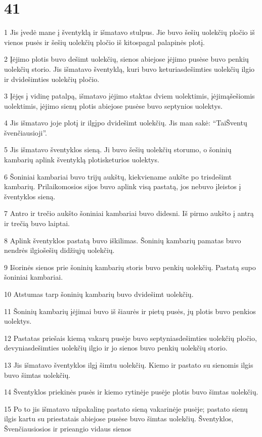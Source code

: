 \chapter{41}


\par 1 Jis įvedė mane į šventyklą ir išmatavo stulpus. Jie buvo šešių uolekčių pločio iš vienos pusės ir šešių uolekčių pločio iš kitos­pagal palapinės plotį. 
\par 2 Įėjimo plotis buvo dešimt uolekčių, sienos abiejose įėjimo pusėse buvo penkių uolekčių storio. Jis išmatavo šventyklą, kuri buvo keturiasdešimties uolekčių ilgio ir dvidešimties uolekčių pločio. 
\par 3 Įėjęs į vidinę patalpą, išmatavo įėjimo staktas dviem uolektimis, įėjimą­šešiomis uolektimis, įėjimo sienų plotis abiejose pusėse buvo septynios uolektys. 
\par 4 Jis išmatavo joje plotį ir ilgį­po dvidešimt uolekčių. Jis man sakė: “Tai­Šventų švenčiausioji”. 
\par 5 Jis išmatavo šventyklos sieną. Ji buvo šešių uolekčių storumo, o šoninių kambarių aplink šventyklą plotis­keturios uolektys. 
\par 6 Šoniniai kambariai buvo trijų aukštų, kiekviename aukšte po trisdešimt kambarių. Prilaikomosios sijos buvo aplink visą pastatą, jos nebuvo įleistos į šventyklos sieną. 
\par 7 Antro ir trečio aukšto šoniniai kambariai buvo didesni. Iš pirmo aukšto į antrą ir trečią buvo laiptai. 
\par 8 Aplink šventyklos pastatą buvo iškilimas. Šoninių kambarių pamatas buvo nendrės ilgio­šešių didžiųjų uolekčių. 
\par 9 Išorinės sienos prie šoninių kambarių storis buvo penkių uolekčių. Pastatą supo šoniniai kambariai. 
\par 10 Atstumas tarp šoninių kambarių buvo dvidešimt uolekčių. 
\par 11 Šoninių kambarių įėjimai buvo iš šiaurės ir pietų pusės, jų plotis buvo penkios uolektys. 
\par 12 Pastatas priešais kiemą vakarų pusėje buvo septyniasdešimties uolekčių pločio, devyniasdešimties uolekčių ilgio ir jo sienos buvo penkių uolekčių storio. 
\par 13 Jis išmatavo šventyklos ilgį šimtu uolekčių. Kiemo ir pastato su sienomis ilgis buvo šimtas uolekčių. 
\par 14 Šventyklos priekinės pusės ir kiemo rytinėje pusėje plotis buvo šimtas uolekčių. 
\par 15 Po to jis išmatavo užpakalinę pastato sieną vakarinėje pusėje; pastato sienų ilgis kartu su priestatais abiejose pusėse buvo šimtas uolekčių. Šventyklos, Švenčiausiosios ir prieangio vidaus sienos 
